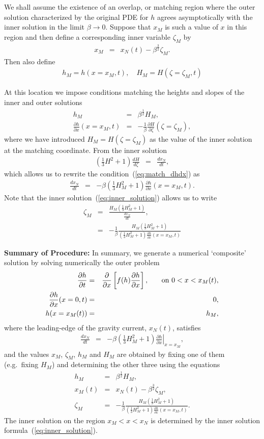 \documentclass[11pt]{article}
\newcommand{\bea}{\begin{eqnarray}}
\newcommand{\eea}{\end{eqnarray}}
\begin{document}
We shall assume the existence of an overlap, or matching region where the outer solution characterized by the original PDE for $h$ agrees
asymptotically with the inner solution in the limit $\beta \rightarrow 0$.    Suppose that $x_M$ is such a value of $x$ in this region and then define
a corresponding inner variable $\zeta_M$ by 
\bea
x_M & = & x_N(t) - \beta^{\frac{3}{2}} \zeta_M.
\eea
Then also define
\bea
h_M = h(x=x_M,t),\quad
H_M = H(\zeta=\zeta_M,t)
\eea

At this location we impose conditions matching the heights and slopes of the inner and outer solutions
\bea
\label{eq:match_h}
h_M & = & \beta^{\frac{1}{2}} H_M,\\
\label{eq:match_dhdx}
\frac{\partial h}{\partial x}(x=x_M,t) & = & -\frac{1}{\beta} \frac{\partial H}{\partial \zeta}(\zeta = \zeta_M),
\eea
where we have introduced $H_M = H(\zeta= \zeta_M)$ as the value of the inner solution at the matching coordinate.  
From the inner solution 
\bea
\left( \frac{1}{3} H^2 + 1 \right) \frac{dH}{d\zeta} & = & \frac{dx_N}{dt},
\eea
which allows us to rewrite the condition~(\ref{eq:match_dhdx}) as
\bea
\frac{dx_N}{dt} & = & - \beta \left( \frac{1}{3} H_M^2 + 1 \right) \frac{\partial h}{\partial x}(x=x_M,t).
\eea
Note that the inner solution~(\ref{eq:inner_solution}) allows us to write
\bea
\zeta_M & = & \frac{H_M \left( \frac{1}{9} H_M^2 + 1 \right) }{\frac{dx_N}{dt}},\nonumber \\
 & = & - \frac{1}{\beta} \frac{H_M \left( \frac{1}{9} H_M^2 + 1 \right) }{ \left( \frac{1}{3} H_M^2 + 1 \right) \frac{\partial h}{\partial x}(x=x_M,t) } 
\eea

{\bf Summary of Procedure:} In summary, we generate a numerical `composite' solution by solving numerically the outer problem
\bea
\label{eq:outer_h}
\frac{\partial h}{\partial t} & = & \frac{\partial}{\partial x} \left[ f(h)\frac{\partial h}{\partial x} \right], \hspace{0.25in} \mbox{on $0 < x < x_M(t)$},\\
\label{eq:outer_bc1}
\frac{\partial h}{\partial x}(x=0,t) & = & 0,\\
\label{eq:outer_bc2}
h(x=x_M(t)) & = & h_M,
\eea
where the leading-edge of the gravity current, $x_N(t)$, satisfies
\bea
\label{eq:outer_bc3}
\frac{dx_N}{dt} & = & - \beta \left( \frac{1}{3} H^2_M + 1 \right) \left. \frac{\partial h}{\partial x} \right|_{x=x_M},
\eea
and the values $x_M$, $\zeta_M$, $h_M$ and $H_M$ are obtained by fixing one of them (e.g.~fixing $H_M$) and determining the other three using the equations
\bea
\label{eq:hM}
h_M & = & \beta^{\frac{1}{2}} H_M, \\
\label{eq:xM}
x_M(t) & = & x_N(t) - \beta^{\frac{3}{2}} \zeta_M,\\
\label{eq:zM}
\zeta_M & = & - \frac{1}{\beta} \frac{H_M \left( \frac{1}{9} H_M^2 + 1 \right) }{ \left( \frac{1}{3} H_M^2 + 1 \right) \frac{\partial h}{\partial x}(x=x_M,t) }.
\eea
The inner solution on the region $x_M < x < x_N$ is determined by the inner solution formula~(\ref{eq:inner_solution}).
\end{document}

